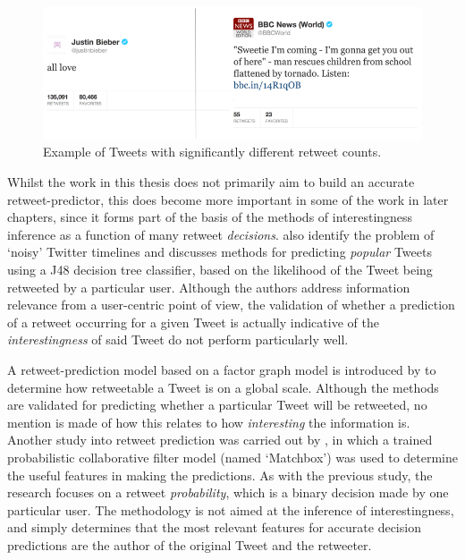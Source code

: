 \begin{figure}[h]
\centering
\includegraphics[scale=0.55]{2.Background/Media/compared_tweets.png} 
\caption{Example of Tweets with significantly different retweet counts.}
\label{fig:tweet_comparison}
\end{figure}

Whilst the work in this thesis does not primarily aim to build an accurate retweet-predictor, this does become more important in some of the work in later chapters, since it forms part of the basis of the methods of interestingness inference as a function of many retweet \textit{decisions}. \citet{uysal11} also identify the problem of `noisy' Twitter timelines and discusses methods for predicting \textit{popular} Tweets using a J48 decision tree classifier, based on the likelihood of the Tweet being retweeted by a particular user. Although the authors address information relevance from a user-centric point of view, the validation of whether a prediction of a retweet occurring for a given Tweet is actually indicative of the \textit{interestingness} of said Tweet do not perform particularly well.

A retweet-prediction model based on a factor graph model is introduced by \citet{yang10} to determine how retweetable a Tweet is on a global scale. Although the methods are validated for predicting whether a particular Tweet will be retweeted, no mention is made of how this relates to how \textit{interesting} the information is. Another study into retweet prediction was carried out by \citet{zaman10}, in which a trained probabilistic collaborative filter model (named `Matchbox') was used to determine the useful features in making the predictions. As with the previous study, the research focuses on a retweet \textit{probability}, which is a binary decision made by one particular user. The methodology is not aimed at the inference of interestingness, and simply determines that the most relevant features for accurate decision predictions are the author of the original Tweet and the retweeter.

